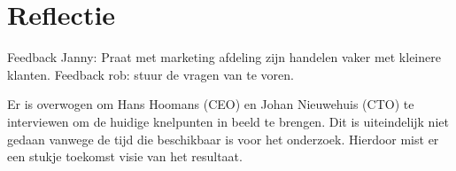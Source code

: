 \chapter{Reflectie}
Feedback Janny: Praat met marketing afdeling zijn handelen vaker met kleinere klanten.
Feedback rob: stuur de vragen van te voren.

\whitespace
Er is overwogen om Hans Hoomans (CEO) en Johan Nieuwehuis (CTO) te interviewen om de huidige knelpunten in beeld te brengen.
Dit is uiteindelijk niet gedaan vanwege de tijd die beschikbaar is voor het onderzoek.
Hierdoor mist er een stukje toekomst visie van het resultaat.
